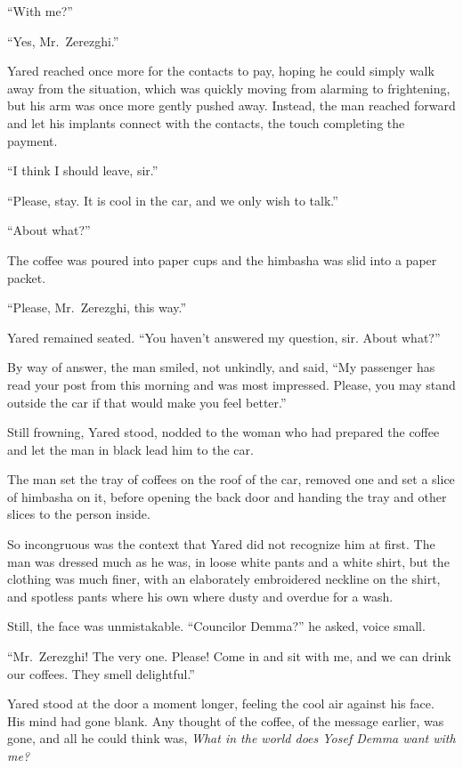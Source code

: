 ``With me?''

``Yes, Mr.~Zerezghi.''

Yared reached once more for the contacts to pay, hoping he could simply walk away from the situation, which was quickly moving from alarming to frightening, but his arm was once more gently pushed away. Instead, the man reached forward and let his implants connect with the contacts, the touch completing the payment.

``I think I should leave, sir.''

``Please, stay. It is cool in the car, and we only wish to talk.''

``About what?''

The coffee was poured into paper cups and the himbasha was slid into a paper packet.

``Please, Mr.~Zerezghi, this way.''

Yared remained seated. ``You haven't answered my question, sir. About what?''

By way of answer, the man smiled, not unkindly, and said, ``My passenger has read your post from this morning and was most impressed. Please, you may stand outside the car if that would make you feel better.''

Still frowning, Yared stood, nodded to the woman who had prepared the coffee and let the man in black lead him to the car.

The man set the tray of coffees on the roof of the car, removed one and set a slice of himbasha on it, before opening the back door and handing the tray and other slices to the person inside.

So incongruous was the context that Yared did not recognize him at first. The man was dressed much as he was, in loose white pants and a white shirt, but the clothing was much finer, with an elaborately embroidered neckline on the shirt, and spotless pants where his own where dusty and overdue for a wash.

Still, the face was unmistakable. ``Councilor Demma?'' he asked, voice small.

``Mr.~Zerezghi! The very one. Please! Come in and sit with me, and we can drink our coffees. They smell delightful.''

Yared stood at the door a moment longer, feeling the cool air against his face. His mind had gone blank. Any thought of the coffee, of the message earlier, was gone, and all he could think was, \emph{What in the world does Yosef Demma want with me?}

